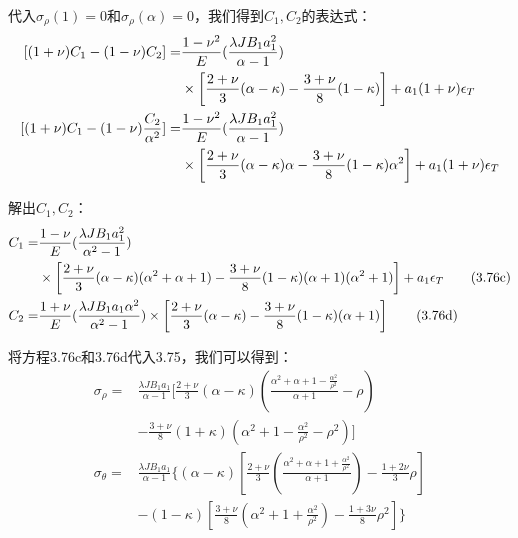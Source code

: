 代入$\sigma_{\rho}(1)=0$和$\sigma_{\rho}(\alpha)=0$，我们得到$C_1,C_2$的表达式：
\begin{subequations}
	\begin{align}
{[(1+\nu)C_1-(1-\nu)C_2]}=&\frac{1-\nu^2}{E}(\frac{\lambda JB_1a_1^2}{\alpha-1})\notag\\
&\times\left[\frac{2+\nu}{3}(\alpha-\kappa)-\frac{3+\nu}{8}(1-\kappa)\right]+a_1(1+\nu)\epsilon_T\\
{[(1+\nu)C_1-(1-\nu)\frac{C_2}{\alpha^2}]}=&\frac{1-\nu^2}{E}(\frac{\lambda JB_1a_1^2}{\alpha-1}) \notag\\ 
&\times\left[\frac{2+\nu}{3}(\alpha-\kappa)\alpha-\frac{3+\nu}{8}(1-\kappa)\alpha^2\right] +a_1(1+\nu)\epsilon_T
	\end{align}
\end{subequations}

解出$C_1,C_2$：
\begin{align*}
C_1=&\frac{1-\nu}{E}(\frac{\lambda JB_1a_1^2}{\alpha^2-1})\notag\\
&\times\left[\frac{2+\nu}{3}(\alpha-\kappa)(\alpha^2+\alpha+1)
-\frac{3+\nu}{8}(1-\kappa)(\alpha+1)(\alpha^2+1)\right]
+a_1\epsilon_T\tag{3.76c}\\
C_2=&\frac{1+\nu}{E}(\frac{\lambda JB_1a_1\alpha^2}{\alpha^2-1})\times \left[\frac{2+\nu}{3}(\alpha-\kappa)-\frac{3+\nu}{8}(1-\kappa)(\alpha+1)\right]\tag{3.76d}
\end{align*}

将方程3.76c和3.76d代入3.75，我们可以得到：
\begin{subequations}
	\begin{align}
\sigma_\rho=&\frac{\lambda JB_1a_1}{\alpha-1}[\frac{2+\nu}{3}(\alpha-\kappa)(\frac{\alpha^2+\alpha+1-\frac{\alpha^2}{\rho^2}}{\alpha+1}-\rho) \\ \nonumber
&-\frac{3+\nu}{8}(1+\kappa)(\alpha^2+1-\frac{\alpha^2}{\rho^2}-\rho^2)]\\
\sigma_\theta=&\frac{\lambda JB_1a_1}{\alpha-1}\{(\alpha-\kappa)[\frac{2+\nu}{3}(\frac{\alpha^2+\alpha+1+{\frac{\alpha^2}{\rho^2}}}{\alpha+1})-\frac{1+2\nu}{3}\rho] \\ \nonumber
&-(1-\kappa)[\frac{3+\nu}{8}(\alpha^2+1+\frac{\alpha^2}{\rho^2})-\frac{1+3\nu}{8}\rho^2]\}
	\end{align}
\end{subequations}

